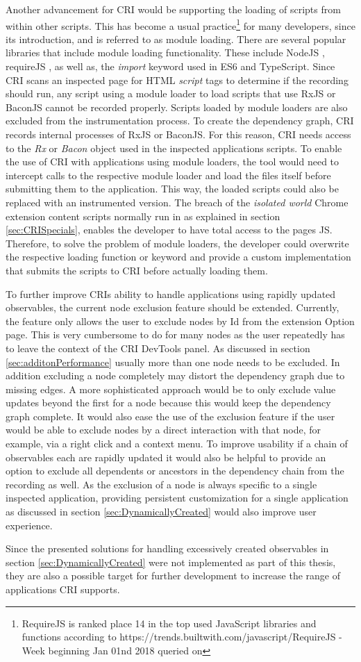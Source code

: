 Another advancement for CRI would be supporting the loading of scripts from within other scripts. This has become a usual practice\footnote{RequireJS is ranked place 14 in the top used JavaScript libraries and functions according to https://trends.builtwith.com/javascript/RequireJS - Week beginning Jan 01nd 2018 queried on \date{2018-01-03}} for many developers, since its introduction, and is referred to as module loading. There are several popular libraries that include module loading functionality. These include NodeJS \cite{NodeJS}, requireJS \cite{RequireJS}, as well as, the \emph{import} keyword used in ES6 and TypeScript. Since CRI scans an inspected page for HTML \emph{script} tags to determine if the recording should run, any script using a module loader to load scripts that use RxJS or BaconJS cannot be recorded properly. Scripts loaded by module loaders are also excluded from the instrumentation process. To create the dependency graph, CRI records internal processes of RxJS or BaconJS. For this reason, CRI needs access to the \emph{Rx} or \emph{Bacon} object used in the inspected applications scripts. To enable the use of CRI with applications using module loaders, the tool would need to intercept calls to the respective module loader and load the files itself before submitting them to the application. This way, the loaded scripts could also be replaced with an instrumented version. The breach of the \emph{isolated world} Chrome extension content scripts normally run in as explained in section \ref{sec:CRISpecials}, enables the developer to have total access to the pages JS. Therefore, to solve the problem of module loaders, the developer could overwrite the respective loading function or keyword and provide a custom implementation that submits the scripts to CRI before actually loading them.
	
To further improve CRIs ability to handle applications using rapidly updated observables, the current node exclusion feature should be extended. Currently, the feature only allows the user to exclude nodes by Id from the extension Option page. This is very cumbersome to do for many nodes as the user repeatedly has to leave the context of the CRI DevTools panel. As discussed in section \ref{sec:additonPerformance} usually more than one node needs to be excluded. In addition excluding a node completely may distort the dependency graph due to missing edges. A more sophisticated approach would be to only exclude value updates beyond the first for a node because this would keep the dependency graph complete. It would also ease the use of the exclusion feature if the user would be able to exclude nodes by a direct interaction with that node, for example, via a right click and a context menu. To improve usability if a chain of observables each are rapidly updated it would also be helpful to provide an option to exclude all dependents or ancestors in the dependency chain from the recording as well.
As the exclusion of a node is always specific to a single inspected application, providing persistent customization for a single application as discussed in section \ref{sec:DynamicallyCreated} would also improve user experience.

Since the presented solutions for handling excessively created observables in section \ref{sec:DynamicallyCreated} were not implemented as part of this thesis, they are also a possible target for further development to increase the range of applications CRI supports.
 	
